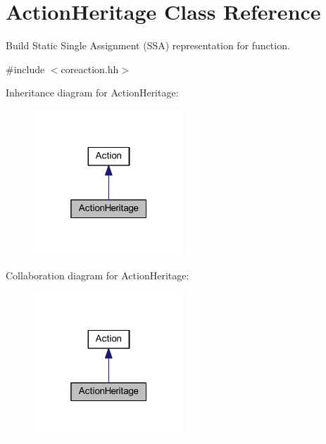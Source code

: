\hypertarget{class_action_heritage}{}\section{Action\+Heritage Class Reference}
\label{class_action_heritage}


Build Static Single Assignment (S\+SA) representation for function.  




{\ttfamily \#include $<$coreaction.\+hh$>$}



Inheritance diagram for Action\+Heritage\+:
\nopagebreak
\begin{figure}[H]
\begin{center}
\leavevmode
\includegraphics[width=160pt]{class_action_heritage__inherit__graph}
\end{center}
\end{figure}


Collaboration diagram for Action\+Heritage\+:
\nopagebreak
\begin{figure}[H]
\begin{center}
\leavevmode
\includegraphics[width=160pt]{class_action_heritage__coll__graph}
\end{center}
\end{figure}
